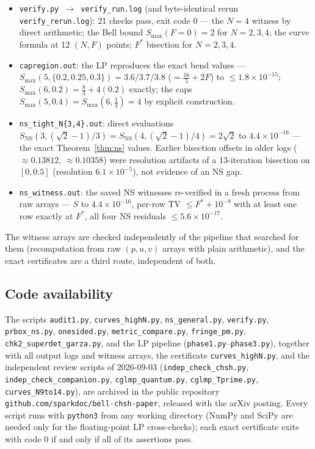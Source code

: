 \documentclass[aps,pra,reprint,superscriptaddress,floatfix]{revtex4-2}
\begin{document}
\begin{itemize}\raggedright
\item \texttt{verify.py $\to$ verify\_run.log} (and byte-identical rerun
  \texttt{verify\_rerun.log}): 21 checks pass, exit code $0$ --- the $N=4$
  witness by direct arithmetic; the Bell bound $S_{\max}(F{=}0)=2$ for
  $N=2,3,4$; the curve formula at 12 $(N,F)$ points; $F^*$ bisection for
  $N=2,3,4$.
\item \texttt{capregion.out}: the LP reproduces the exact bend values ---
  $S_{\max}(5,\{0.2,0.25,0.3\})=3.6/3.7/3.8$ ($=\tfrac{16}{5}+2F$) to
  $\le1.8\times10^{-15}$; $S_{\max}(6,0.2)=\tfrac83+4(0.2)$ exactly; the caps
  $S_{\max}(5,0.4)=S_{\max}(6,\tfrac13)=4$ by explicit construction.
\item \texttt{ns\_tight\_N\{3,4\}.out}: direct evaluations
  $S_{\mathrm{NS}}(3,(\sqrt2-1)/3)=S_{\mathrm{NS}}(4,(\sqrt2-1)/4)=2\sqrt2$
  to $4.4\times10^{-16}$ --- the exact Theorem~\ref{thm:ns} values. Earlier bisection
  offsets in older logs ($\approx0.13812$, $\approx0.10358$) were resolution
  artifacts of a 13-iteration bisection on $[0,0.5]$ (resolution
  $6.1\times10^{-5}$), not evidence of an NS gap.
\item \texttt{ns\_witness.out}: the saved NS witnesses re-verified in a fresh
  process from raw arrays --- $S$ to $4.4\times10^{-16}$, per-row TV
  $\le F^*+10^{-9}$ with at least one row exactly at $F^*$, all four NS
  residuals $\le5.6\times10^{-17}$.
\end{itemize}

The witness arrays are checked independently of the pipeline that searched
for them (recomputation from raw $(p,u,v)$ arrays with plain arithmetic), and
the exact certificates are a third route, independent of both.

\subsection{Code availability}

The scripts \texttt{audit1.py}, \texttt{curves\_highN.py}, \texttt{ns\_general.py}, \texttt{verify.py},
\texttt{prbox\_ns.py}, \texttt{onesided.py}, \texttt{metric\_compare.py},
\texttt{fringe\_pm.py}, \texttt{chk2\_superdet\_garza.py}, and the LP
pipeline (\texttt{phase1.py}--\texttt{phase3.py}), together with all output logs and witness arrays, the certificate
\texttt{curves\_highN.py}, and the independent review scripts of
2026-09-03 (\texttt{indep\_check\_chsh.py},
\texttt{indep\_check\_companion.py}, \texttt{cglmp\_quantum.py},
\texttt{cglmp\_Tprime.py}, \texttt{curves\_N9to14.py}), are archived in
the public repository \texttt{github.com/sparkdoc/}\allowbreak\texttt{bell-chsh-paper},
released with the arXiv posting. Every script runs with \texttt{python3}
from any working directory (NumPy and SciPy are needed only for the
floating-point LP cross-checks); each exact certificate exits with code $0$
if and only if all of its assertions pass.
\end{document}
